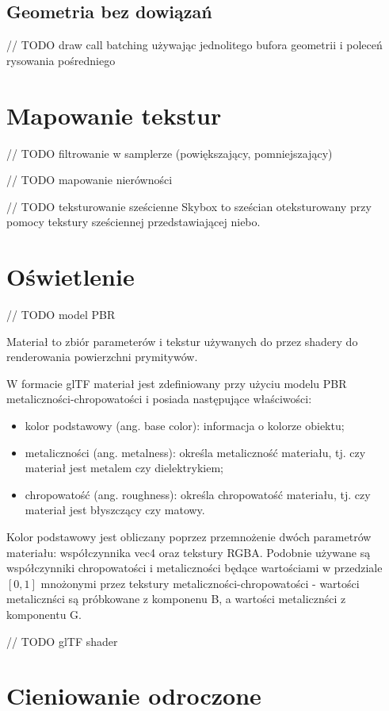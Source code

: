 \subsection {Geometria bez dowiązań}

// TODO draw call batching używając jednolitego bufora geometrii i poleceń rysowania pośredniego

\section{Mapowanie tekstur}

// TODO filtrowanie w samplerze (powiększający, pomniejszający)

// TODO mapowanie nierówności

// TODO teksturowanie sześcienne
Skybox to sześcian oteksturowany przy pomocy tekstury sześciennej przedstawiającej niebo.

\section{Oświetlenie}

// TODO model PBR

Materiał to zbiór parameterów i tekstur używanych do przez shadery do renderowania powierzchni prymitywów.

W formacie glTF materiał jest zdefiniowany przy użyciu modelu PBR metaliczności-chropowatości i posiada następujące właściwości:
\begin{itemize}
	\item kolor podstawowy (ang. base color): informacja o kolorze obiektu;
	\item metaliczności (ang. metalness): określa metaliczność materiału, tj. czy materiał jest metalem czy dielektrykiem;
	\item chropowatość (ang. roughness): określa chropowatość materiału, tj. czy materiał jest błyszczący czy matowy.
\end{itemize}

Kolor podstawowy jest obliczany poprzez przemnożenie dwóch parametrów materiału: współczynnika vec4 oraz tekstury RGBA.
Podobnie używane są współczynniki chropowatości i metaliczności będące wartościami w przedziale $\left[0,1\right]$ mnożonymi przez tekstury metaliczności-chropowatości - wartości metalicznści są próbkowane z komponenu B, a wartości metalicznści z komponentu G.

// TODO glTF shader

\section{Cieniowanie odroczone}

